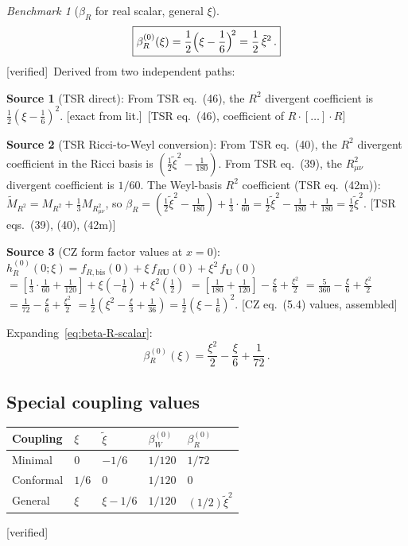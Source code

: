 \documentclass[12pt,a4paper]{article}
\theoremstyle{definition}
\theoremstyle{remark}
\newtheorem{benchmark}[proposition]{Benchmark}
\newcommand{\fromlit}[1]{\textcolor{blue!70!black}{\textsf{[#1]}}}
\newcommand{\exactlit}{\textcolor{blue!60!black}{\textsf{[exact from lit.]}}}
\newcommand{\verified}{\textcolor{green!50!black}{\textsf{[verified]}}}
\begin{document}
\begin{benchmark}[$\beta_R$ for real scalar, general $\xi$]
\label{bench:beta-R}
\begin{equation}
  \boxed{
  \beta_R^{(0)}(\xi) = \frac{1}{2}\Bigl(\xi - \frac{1}{6}\Bigr)^{\!2}
  = \frac{1}{2}\,\tilde{\xi}^2\,.
  }
  \label{eq:beta-R-scalar}
\end{equation}
\verified\ Derived from two independent paths:

\medskip\noindent
\textbf{Source 1} (TSR direct): From TSR eq.~(46), the $R^2$
divergent coefficient is $\frac{1}{2}(\xi-\frac{1}{6})^2$.
\exactlit\ \fromlit{TSR eq.~(46), coefficient of $R\cdot[\ldots]\cdot R$}

\medskip\noindent
\textbf{Source 2} (TSR Ricci-to-Weyl conversion):
From TSR eq.~(40), the $R^2$ divergent coefficient in the Ricci basis is
$(\frac{1}{2}\tilde{\xi}^2 - \frac{1}{180})$.
From TSR eq.~(39), the $R_{\mu\nu}^2$ divergent coefficient is $1/60$.
The Weyl-basis $R^2$ coefficient (TSR eq.~(42m)):
$\tilde{M}_{R^2} = M_{R^2} + \frac{1}{3}M_{R_{\mu\nu}^2}$, so
$\beta_R = (\frac{1}{2}\tilde{\xi}^2 - \frac{1}{180}) + \frac{1}{3}\cdot\frac{1}{60}
= \frac{1}{2}\tilde{\xi}^2 - \frac{1}{180} + \frac{1}{180}
= \frac{1}{2}\tilde{\xi}^2$.
\fromlit{TSR eqs.~(39), (40), (42m)}

\medskip\noindent
\textbf{Source 3} (CZ form factor values at $x=0$):
$h_R^{(0)}(0;\xi) = f_{R,\mathrm{bis}}(0) + \xi\,f_{R\mathbf{U}}(0)
+ \xi^2\,f_{\mathbf{U}}(0)$
$= [\frac{1}{3}\cdot\frac{1}{60} + \frac{1}{120}] + \xi(-\frac{1}{6}) + \xi^2(\frac{1}{2})$
$= [\frac{1}{180}+\frac{1}{120}] - \frac{\xi}{6} + \frac{\xi^2}{2}$
$= \frac{5}{360} - \frac{\xi}{6} + \frac{\xi^2}{2}$
$= \frac{1}{72} - \frac{\xi}{6} + \frac{\xi^2}{2}$
$= \frac{1}{2}(\xi^2 - \frac{\xi}{3} + \frac{1}{36})
= \frac{1}{2}(\xi - \frac{1}{6})^2$.
\fromlit{CZ eq.~(5.4) values, assembled}
\end{benchmark}

Expanding~\eqref{eq:beta-R-scalar}:
\begin{equation}
  \beta_R^{(0)}(\xi) = \frac{\xi^2}{2} - \frac{\xi}{6} + \frac{1}{72}\,.
  \label{eq:beta-R-expanded}
\end{equation}

\subsection{Special coupling values}

\begin{center}
\renewcommand{\arraystretch}{1.4}
\begin{tabular}{lllll}
\toprule
\textbf{Coupling} & $\xi$ & $\tilde{\xi}$ & $\beta_W^{(0)}$
  & $\beta_R^{(0)}$ \\
\midrule
Minimal & $0$ & $-1/6$ & $1/120$ & $1/72$ \\
Conformal & $1/6$ & $0$ & $1/120$ & $0$ \\
General & $\xi$ & $\xi-1/6$ & $1/120$ & $(1/2)\tilde{\xi}^2$ \\
\bottomrule
\end{tabular}
\end{center}
\verified
\end{document}

